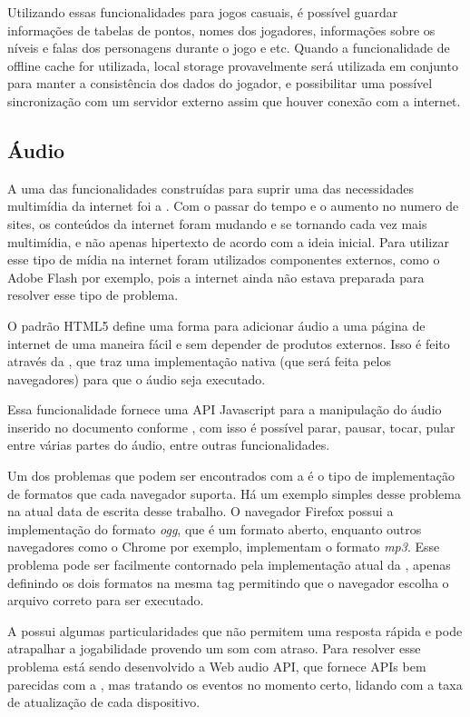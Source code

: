 Utilizando essas funcionalidades para jogos casuais, é possível
guardar informações de tabelas de pontos, nomes dos jogadores,
informações sobre os níveis e falas dos personagens durante o jogo e
etc. Quando a funcionalidade de offline cache for utilizada, local
storage provavelmente será utilizada em conjunto para manter a
consistência dos dados do jogador, e possibilitar uma possível
sincronização com um servidor externo assim que houver conexão com a
internet.

\subsection{Áudio}
A uma das funcionalidades construídas para suprir uma das necessidades multimídia
da internet foi a \tagaudio. Com o passar do tempo e o aumento no
numero de sites, os conteúdos da internet foram mudando
e se tornando cada vez mais multimídia, e não apenas hipertexto de
acordo com a ideia inicial. Para utilizar esse tipo de mídia na
internet foram utilizados componentes externos, como o Adobe Flash por
exemplo, pois a internet ainda não estava preparada para resolver esse
tipo de problema.

O padrão HTML5 define uma forma para adicionar áudio a uma página de
internet de uma maneira fácil e sem depender de produtos externos.
Isso é feito através da \tagaudio, que traz uma
implementação nativa (que será feita pelos navegadores) para que o
áudio seja executado.

Essa funcionalidade fornece uma API Javascript para a manipulação do
áudio inserido no documento conforme ,
com isso é possível parar, pausar, tocar,
pular entre várias partes do áudio, entre outras funcionalidades.

Um dos problemas que podem ser encontrados com a \tagaudio é o tipo de
implementação de formatos que cada navegador suporta. Há um exemplo
simples desse problema na atual data de escrita desse trabalho. O
navegador Firefox possui a implementação do formato \textit{ogg}, que
é um formato aberto, enquanto outros navegadores como o Chrome por
exemplo, implementam o formato \textit{mp3}. Esse problema pode ser
facilmente contornado pela implementação atual da \tagaudio,
apenas definindo os dois formatos na mesma tag permitindo que o
navegador escolha o arquivo correto para ser executado.

A \tagaudio possui algumas particularidades que não permitem uma
resposta rápida e pode atrapalhar a jogabilidade provendo um som com
atraso. Para resolver esse problema está sendo desenvolvido a
Web audio API, que fornece APIs bem parecidas com a \tagaudio, mas
tratando os eventos no momento certo, lidando com a taxa de
atualização de cada dispositivo.

